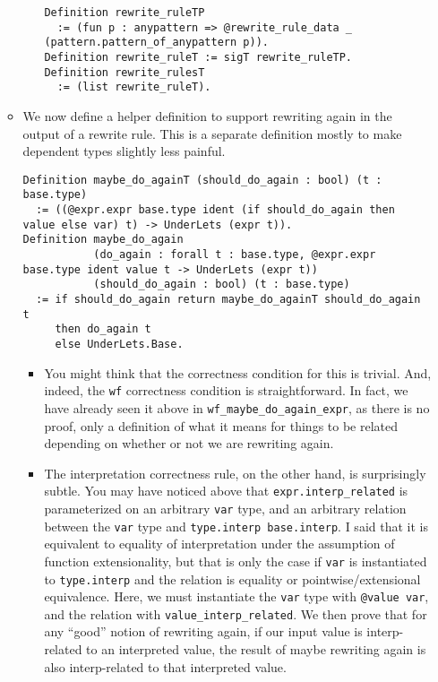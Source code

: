 \begin{itemize}
\begin{itemize}
\begin{itemize}
\begin{verbatim}
Definition rewrite_ruleTP
  := (fun p : anypattern => @rewrite_rule_data _ (pattern.pattern_of_anypattern p)).
Definition rewrite_ruleT := sigT rewrite_ruleTP.
Definition rewrite_rulesT
  := (list rewrite_ruleT).
\end{verbatim}
    \end{itemize}
  \item
    We now define a helper definition to support rewriting again in the
    output of a rewrite rule. This is a separate definition mostly to
    make dependent types slightly less painful.

\begin{verbatim}
Definition maybe_do_againT (should_do_again : bool) (t : base.type)
  := ((@expr.expr base.type ident (if should_do_again then value else var) t) -> UnderLets (expr t)).
Definition maybe_do_again
           (do_again : forall t : base.type, @expr.expr base.type ident value t -> UnderLets (expr t))
           (should_do_again : bool) (t : base.type)
  := if should_do_again return maybe_do_againT should_do_again t
     then do_again t
     else UnderLets.Base.
\end{verbatim}

    \begin{itemize}
    \item
      You might think that the correctness condition for this is
      trivial. And, indeed, the \texttt{wf} correctness condition is
      straightforward. In fact, we have already seen it above in
      \texttt{wf\_maybe\_do\_again\_expr}, as there is no proof, only a
      definition of what it means for things to be related depending on
      whether or not we are rewriting again.
    \item
      The interpretation correctness rule, on the other hand, is
      surprisingly subtle. You may have noticed above that
      \texttt{expr.interp\_related} is parameterized on an arbitrary
      \texttt{var} type, and an arbitrary relation between the
      \texttt{var} type and \texttt{type.interp\ base.interp}. I said
      that it is equivalent to equality of interpretation under the
      assumption of function extensionality, but that is only the case
      if \texttt{var} is instantiated to \texttt{type.interp} and the
      relation is equality or pointwise/extensional equivalence. Here,
      we must instantiate the \texttt{var} type with
      \texttt{@value\ var}, and the relation with
      \texttt{value\_interp\_related}. We then prove that for any
      ``good'' notion of rewriting again, if our input value is
      interp-related to an interpreted value, the result of maybe
      rewriting again is also interp-related to that interpreted value.


\end{itemize}
\end{itemize}
\end{itemize}
